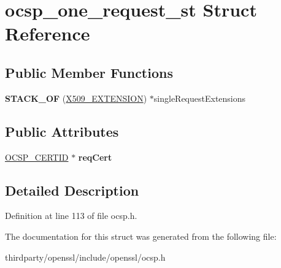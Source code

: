 \hypertarget{structocsp__one__request__st}{}\section{ocsp\+\_\+one\+\_\+request\+\_\+st Struct Reference}
\label{structocsp__one__request__st}
\subsection*{Public Member Functions}
\begin{DoxyCompactItemize}
\item 
\mbox{\label{structocsp__one__request__st_af1c47eb44df3e6c48e9a904b7cec0011}} 
{\bfseries S\+T\+A\+C\+K\+\_\+\+OF} (\hyperlink{struct_x509__extension__st}{X509\+\_\+\+E\+X\+T\+E\+N\+S\+I\+ON}) $\ast$single\+Request\+Extensions
\end{DoxyCompactItemize}
\subsection*{Public Attributes}
\begin{DoxyCompactItemize}
\item 
\mbox{\label{structocsp__one__request__st_acb10504260c2974865557a3d04ff0fa5}} 
\hyperlink{structocsp__cert__id__st}{O\+C\+S\+P\+\_\+\+C\+E\+R\+T\+ID} $\ast$ {\bfseries req\+Cert}
\end{DoxyCompactItemize}


\subsection{Detailed Description}


Definition at line 113 of file ocsp.\+h.



The documentation for this struct was generated from the following file\+:\begin{DoxyCompactItemize}
\item 
thirdparty/openssl/include/openssl/ocsp.\+h\end{DoxyCompactItemize}
